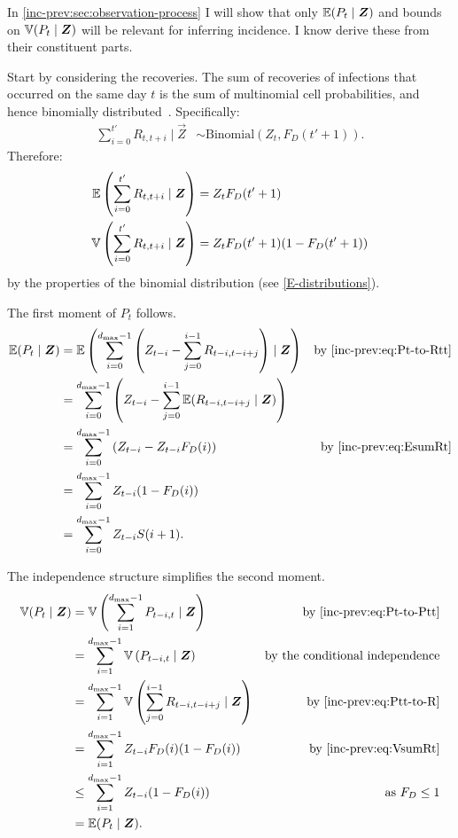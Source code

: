 \documentclass[thesis.tex]{subfiles}
\begin{document}
In \cref{inc-prev:sec:observation-process} I will show that only $\operatorname{\mathbb{E}}(P_t \mid \bm{Z})$ and bounds on $\operatorname{\mathbb{V}}(P_t \mid \bm{Z})$ will be relevant for inferring incidence.
I know derive these from their constituent parts.

Start by considering the recoveries.
The sum of recoveries of infections that occurred on the same day $t$ is the sum of multinomial cell probabilities, and hence binomially distributed~\autocite{alamAnalysis}.
Specifically:
\begin{align}
  \sum_{i=0}^{t'} R_{t,t+i} \mid \vec{Z} &\sim \text{Binomial}(Z_t, F_D(t'+1)). \label{inc-prev:eq:binomialRt}
\end{align}
Therefore:
\begin{align}
  \operatorname{\mathbb{E}} \left( \sum_{i=0}^{t'} R_{t,t+i} \mid \bm{Z} \right) &= Z_t F_D(t'+1) \label{inc-prev:eq:EsumRt} \\
  \operatorname{\mathbb{V}} \left( \sum_{i=0}^{t'} R_{t,t+i} \mid \bm{Z} \right) &= Z_t F_D(t'+1) (1 - F_D(t'+1)) \label{inc-prev:eq:VsumRt}
\end{align}
by the properties of the binomial distribution (see \cref{E-distributions}).

The first moment of $P_t$ follows.
\begin{align}
\E(P_t \mid \vec{Z})
  &= \E\left(\sum_{i=0}^{d_\text{max}-1} \left( Z_{t-i} - \sum_{j=0}^{i-1} R_{t-i,t-i+j} \right) \mid \vec{Z} \right) &\text{by \cref{inc-prev:eq:Pt-to-Rtt}}\\
  &= \sum_{i=0}^{d_\text{max}-1} \left( Z_{t-i} - \sum_{j=0}^{i-1} \E( R_{t-i,t-i+j} \mid \vec{Z}) \right) \\
  &= \sum_{i=0}^{d_\text{max}-1} \left( Z_{t-i} - Z_{t-i} F_D(i) \right) &\text{by \cref{inc-prev:eq:EsumRt}}\\
  &= \sum_{i=0}^{d_\text{max}-1} Z_{t-i} (1 - F_D(i)) \\
  &= \sum_{i=0}^{d_\text{max}-1} Z_{t-i} S(i+1) \label{inc-prev:eq:EPt}.
\end{align}

The independence structure simplifies the second moment.
\begin{align}
\V(P_t \mid \vec{Z})
  &= \V\left(\sum_{i=1}^{d_\text{max}-1} P_{t-i,t} \mid \vec{Z} \right) &\text{by \cref{inc-prev:eq:Pt-to-Ptt}} \\
  &= \sum_{i=1}^{d_\text{max}-1} \V\left(P_{t-i,t} \mid \vec{Z} \right) &\text{by the conditional independence} \\
  &= \sum_{i=1}^{d_\text{max}-1} \V\left(\sum_{j=0}^{i-1} R_{t-i,t-i+j} \mid \vec{Z} \right) &\text{by~\cref{inc-prev:eq:Ptt-to-R}}\\
  &= \sum_{i=1}^{d_\text{max}-1} Z_{t-i} F_D(i) (1 - F_D(i)) &\text{by~\cref{inc-prev:eq:VsumRt}} \\
  &\leq \sum_{i=1}^{d_\text{max}-1} Z_{t-i} (1 - F_D(i)) &\text{as $F_D \leq 1$}\\
  &= \E(P_t \mid \vec{Z}). \label{inc-prev:eq:boundVPt}
\end{align}
\end{document}
